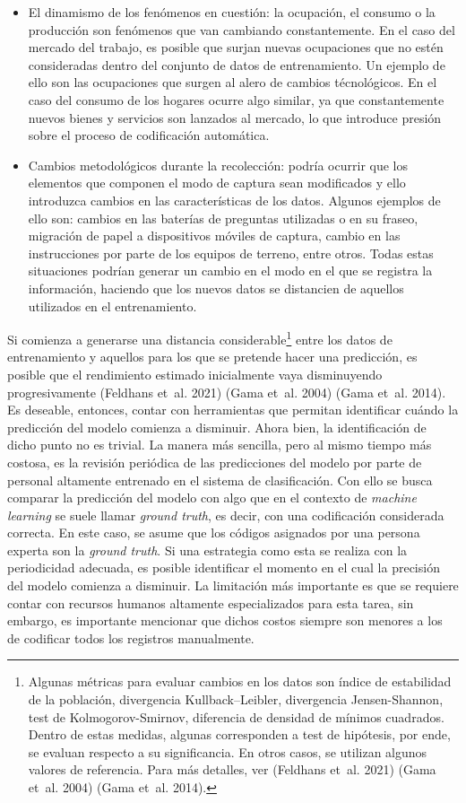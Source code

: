 \documentclass[
  12pt,
  spanish,
]{article}
\begin{document}
\begin{itemize}
\item
  El dinamismo de los fenómenos en cuestión: la ocupación, el consumo o
  la producción son fenómenos que van cambiando constantemente. En el
  caso del mercado del trabajo, es posible que surjan nuevas ocupaciones
  que no estén consideradas dentro del conjunto de datos de
  entrenamiento. Un ejemplo de ello son las ocupaciones que surgen al
  alero de cambios técnológicos. En el caso del consumo de los hogares
  ocurre algo similar, ya que constantemente nuevos bienes y servicios
  son lanzados al mercado, lo que introduce presión sobre el proceso de
  codificación automática.
\item
  Cambios metodológicos durante la recolección: podría ocurrir que los
  elementos que componen el modo de captura sean modificados y ello
  introduzca cambios en las características de los datos. Algunos
  ejemplos de ello son: cambios en las baterías de preguntas utilizadas
  o en su fraseo, migración de papel a dispositivos móviles de captura,
  cambio en las instrucciones por parte de los equipos de terreno, entre
  otros. Todas estas situaciones podrían generar un cambio en el modo en
  el que se registra la información, haciendo que los nuevos datos se
  distancien de aquellos utilizados en el entrenamiento.
\end{itemize}

Si comienza a generarse una distancia considerable\footnote{Algunas
  métricas para evaluar cambios en los datos son índice de estabilidad
  de la población, divergencia Kullback--Leibler, divergencia
  Jensen-Shannon, test de Kolmogorov-Smirnov, diferencia de densidad de
  mínimos cuadrados. Dentro de estas medidas, algunas corresponden a
  test de hipótesis, por ende, se evaluan respecto a su significancia.
  En otros casos, se utilizan algunos valores de referencia. Para más
  detalles, ver (Feldhans et~al. 2021) (Gama et~al. 2004) (Gama et~al.
  2014).} entre los datos de entrenamiento y aquellos para los que se
pretende hacer una predicción, es posible que el rendimiento estimado
inicialmente vaya disminuyendo progresivamente (Feldhans et~al. 2021)
(Gama et~al. 2004) (Gama et~al. 2014). Es deseable, entonces, contar con
herramientas que permitan identificar cuándo la predicción del modelo
comienza a disminuir. Ahora bien, la identificación de dicho punto no es
trivial. La manera más sencilla, pero al mismo tiempo más costosa, es la
revisión periódica de las predicciones del modelo por parte de personal
altamente entrenado en el sistema de clasificación. Con ello se busca
comparar la predicción del modelo con algo que en el contexto de
\emph{machine learning} se suele llamar \emph{ground truth}, es decir,
con una codificación considerada correcta. En este caso, se asume que
los códigos asignados por una persona experta son la \emph{ground
truth}. Si una estrategia como esta se realiza con la periodicidad
adecuada, es posible identificar el momento en el cual la precisión del
modelo comienza a disminuir. La limitación más importante es que se
requiere contar con recursos humanos altamente especializados para esta
tarea, sin embargo, es importante mencionar que dichos costos siempre
son menores a los de codificar todos los registros manualmente.
\end{document}
